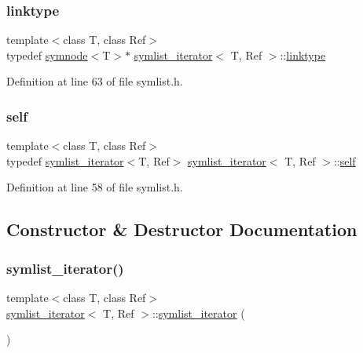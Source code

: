 \subsubsection{\texorpdfstring{linktype}{linktype}}
{\footnotesize\ttfamily template$<$class T, class Ref$>$ \\
typedef \mbox{\hyperlink{structsymnode}{symnode}}$<$T$>$$\ast$ \mbox{\hyperlink{structsymlist__iterator}{symlist\+\_\+iterator}}$<$ T, Ref $>$\+::\mbox{\hyperlink{structsymlist__iterator_ad9462ba519f8ca01ea64e04e25ee3750}{linktype}}}



Definition at line 63 of file symlist.\+h.

\mbox{\label{structsymlist__iterator_ae1426e0085d4c88445c0a84675ee7d38}} 
\subsubsection{\texorpdfstring{self}{self}}
{\footnotesize\ttfamily template$<$class T, class Ref$>$ \\
typedef \mbox{\hyperlink{structsymlist__iterator}{symlist\+\_\+iterator}}$<$T, Ref$>$ \mbox{\hyperlink{structsymlist__iterator}{symlist\+\_\+iterator}}$<$ T, Ref $>$\+::\mbox{\hyperlink{structsymlist__iterator_ae1426e0085d4c88445c0a84675ee7d38}{self}}}



Definition at line 58 of file symlist.\+h.



\subsection{Constructor \& Destructor Documentation}
\mbox{\label{structsymlist__iterator_a9205d4298c3ab0caad86e2f4242a23bb}} 
\subsubsection{\texorpdfstring{symlist\+\_\+iterator()}{symlist\_iterator()}\hspace{0.1cm}{\footnotesize\ttfamily [1/4]}}
{\footnotesize\ttfamily template$<$class T, class Ref$>$ \\
\mbox{\hyperlink{structsymlist__iterator}{symlist\+\_\+iterator}}$<$ T, Ref $>$\+::\mbox{\hyperlink{structsymlist__iterator}{symlist\+\_\+iterator}} (\begin{DoxyParamCaption}{ }\end{DoxyParamCaption})\hspace{0.3cm}{\ttfamily [inline]}}



